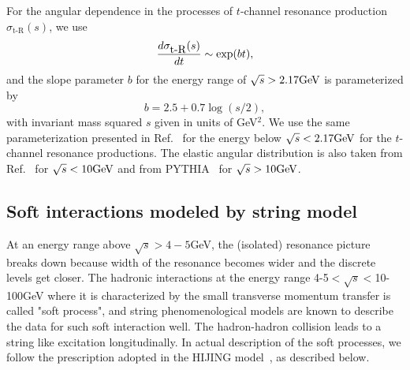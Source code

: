 \documentclass[]{article}
\newcommand{\srt}{\mbox{$\sqrt{s}$}}
\newcommand{\sigtR}{\mbox{$\sigma_{\mbox{t-R}}(s)$}}
\def\GeV{\mbox{\rm GeV}}
\begin{document}
For the angular dependence in the processes of
  $t$-channel resonance production \sigtR,
we use
\begin{equation}
  {d\sigtR \over dt} \sim \exp(bt),
\end{equation}
and the slope parameter $b$ for the energy range of
  $\srt>2.17\GeV$
   is parameterized by
\begin{equation}
   b=2.5 + 0.7\log(s/2),
\end{equation}
with invariant mass squared $s$ given in units of GeV$^2$.
We use the same parameterization presented in Ref.~\cite{niita}
 for the energy below $\srt<2.17\GeV$ for the $t$-channel resonance
productions.
The elastic angular distribution is also taken from Ref.~\cite{niita}
 for $\srt<10\GeV$
and from PYTHIA~\cite{pythia} for $\srt>10\GeV$.









\subsection{Soft interactions modeled by string model} \label{sec:string}

At an energy range above $\srt>4-5$GeV,
the (isolated) resonance picture breaks down because
width of the resonance becomes wider and 
the discrete levels get closer.
The hadronic interactions at
the energy range 4-5$<\srt<$10-100GeV where
it is characterized by the small transverse momentum transfer
is called "soft process", and
string phenomenological models
are known to describe the data for such soft interaction well.
The hadron-hadron collision %
leads to a string like excitation longitudinally.
In actual description of the soft processes,
we follow the prescription adopted in the HIJING model~\cite{hijing}, 
as described below.
\end{document}
